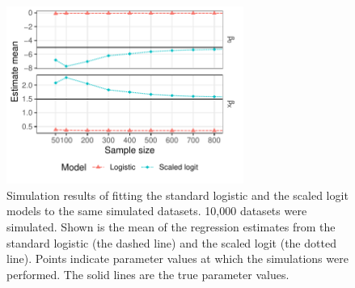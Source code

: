 \begin{figure}[htp]
	\centering
	\includegraphics[width=0.69\textwidth]{../logistic-plot/vary_nsam_mean.pdf}
	\caption{
	Simulation results of fitting the standard logistic and the scaled logit models to the same simulated datasets. 10,000 datasets were simulated. Shown is the mean of the regression estimates from the standard logistic (the dashed line) and the scaled logit (the dotted line). Points indicate parameter values at which the simulations were performed. The solid lines are the true parameter values.
	}
	\label{SclrMean}
\end{figure}
